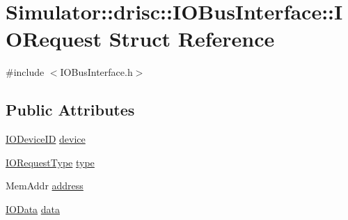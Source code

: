 \hypertarget{struct_simulator_1_1drisc_1_1_i_o_bus_interface_1_1_i_o_request}{\section{Simulator\+:\+:drisc\+:\+:I\+O\+Bus\+Interface\+:\+:I\+O\+Request Struct Reference}
\label{struct_simulator_1_1drisc_1_1_i_o_bus_interface_1_1_i_o_request}
}


{\ttfamily \#include $<$I\+O\+Bus\+Interface.\+h$>$}

\subsection*{Public Attributes}
\begin{DoxyCompactItemize}
\item 
\hyperlink{namespace_simulator_a3493d987c866ad6b8aaa704c42502db0}{I\+O\+Device\+I\+D} \hyperlink{struct_simulator_1_1drisc_1_1_i_o_bus_interface_1_1_i_o_request_a527d35905bdf0a76ff962fb09ce33bcd}{device}
\item 
\hyperlink{class_simulator_1_1drisc_1_1_i_o_bus_interface_a229424ad6cafaf8f1fd82dfd86eac794}{I\+O\+Request\+Type} \hyperlink{struct_simulator_1_1drisc_1_1_i_o_bus_interface_1_1_i_o_request_a8c1c887d3bef0611a8c9a670c7ae4bd5}{type}
\item 
Mem\+Addr \hyperlink{struct_simulator_1_1drisc_1_1_i_o_bus_interface_1_1_i_o_request_a5f0744e607c67889d3b7f3bb6bc98911}{address}
\item 
\hyperlink{struct_simulator_1_1_i_o_data}{I\+O\+Data} \hyperlink{struct_simulator_1_1drisc_1_1_i_o_bus_interface_1_1_i_o_request_a441beafdf6bb492ac58fb5b746e8c319}{data}
\end{DoxyCompactItemize}


